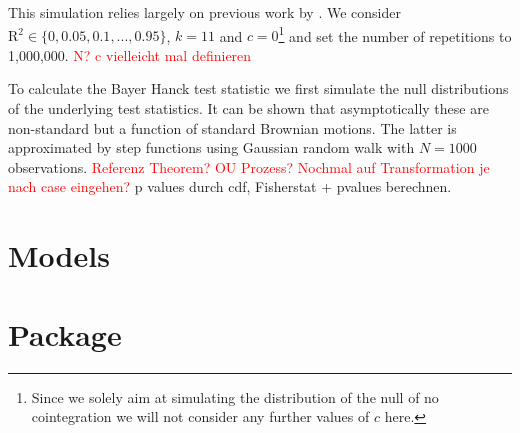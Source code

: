 \documentclass[12pt,a4paper]{article}
\let\rmarkdownfootnote\footnote%
\def\footnote{\protect\rmarkdownfootnote}
\begin{document}
This simulation relies largely on previous work by
\textcite{Pesavento_2004}. We consider
\(\text{R}^2 \in \{0, 0.05, 0.1, ..., 0.95\}\), \(k = 11\) and
\(c = 0\)\footnote{Since we solely aim at simulating the distribution of
  the null of no cointegration we will not consider any further values
  of \(c\) here.} and set the number of repetitions to 1,000,000.
\textcolor{red}{N? c vielleicht mal definieren}

To calculate the Bayer Hanck test statistic we first simulate the null
distributions of the underlying test statistics. It can be shown that
asymptotically these are non-standard but a function of standard
Brownian motions. The latter is approximated by step functions using
Gaussian random walk with \(N = 1000\) observations.
\textcolor{red}{Referenz Theorem? OU Prozess? Nochmal auf Transformation je nach case eingehen?}
p values durch cdf, Fisherstat + pvalues berechnen.

\hypertarget{models}{%
\section{Models}\label{models}}

\hypertarget{package}{%
\section{Package}\label{package}}

\pagebreak

\setcounter{page}{3}
\printbibliography[title = References]
\cleardoublepage

\begin{refsection}
\nocite{R-base}
\nocite{R-stargazer}
\nocite{R-stringr}
\nocite{R-tidyr}
\nocite{R-dplyr}
\nocite{R-glmnet}
\nocite{R-class}
\nocite{R-MASS}
\nocite{R-plm}
\nocite{R-leaps}
\nocite{R-caret}
\nocite{R-tree}
\nocite{R-gbm}
\nocite{R-plotmo}
\nocite{R-pls}
\nocite{R-splines}
\nocite{R-tictoc}
\nocite{R-plotly}
\nocite{R-inspectdf}
\nocite{R-rpart}
\nocite{R-rpart.plot}
\nocite{R-stargazer}
\nocite{R-knitr}
\nocite{R-purrr}
\nocite{R-randomForest}
\nocite{R-rstudioapi}





\nocite{R-Studio}

\printbibliography[title = Software-References]
\end{refsection}
\end{document}
